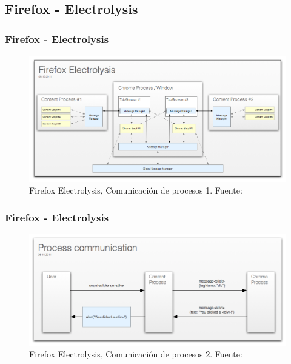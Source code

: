 \documentclass[serif,9pt]{beamer}
\begin{document}
\subsection{Firefox - Electrolysis}
\begin{frame}
	\frametitle{Firefox - Electrolysis}
	\begin{figure}[h]
        \centering
        \includegraphics[scale=0.3]{figures/electrolysis.png}
        \caption{Firefox Electrolysis, Comunicaci\'on de procesos 1. Fuente: \cite{Firefox101}}
        \label{fig:ChromePComm1}
    \end{figure}
\end{frame}

\begin{frame}
	\frametitle{Firefox - Electrolysis}
	\begin{figure}[h]
        \centering
        \includegraphics[width=1\textwidth]{figures/e10s-processes.png}
        \caption{Firefox Electrolysis, Comunicaci\'on de procesos 2. Fuente: \cite{Firefox101}}
        \label{fig:ChromePComm2}
    \end{figure}
\end{frame}

\end{document}
